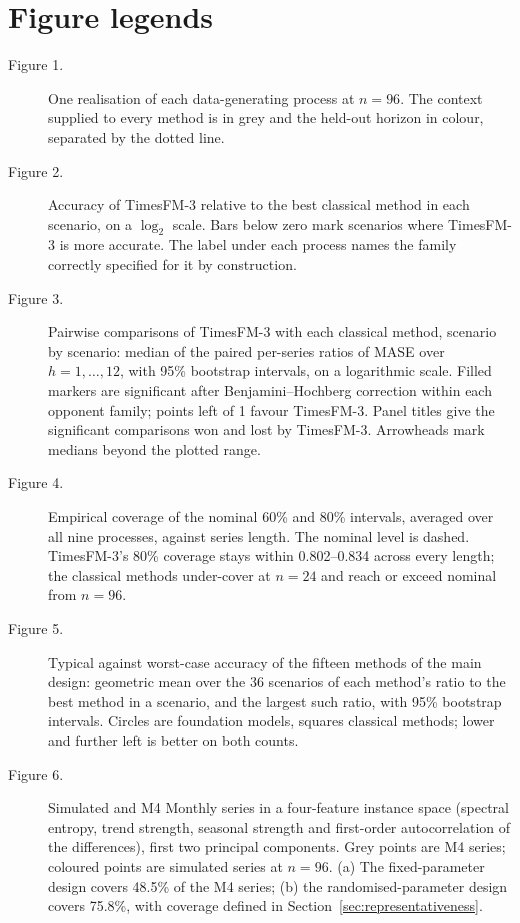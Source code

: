 \documentclass[ASNA]{USG}
\providecommand{\sectionref}[1]{Section~\ref{#1}}
\begin{document}
\section*{Figure legends}

\begin{description}
\item[Figure 1.] One realisation of each data-generating process at $n = 96$. The context supplied to every method is in grey and the held-out horizon in colour, separated by the dotted line.
\item[Figure 2.] Accuracy of TimesFM-3 relative to the best classical method in each scenario, on a $\log_2$ scale. Bars below zero mark scenarios where TimesFM-3 is more accurate. The label under each process names the family correctly specified for it by construction.
\item[Figure 3.] Pairwise comparisons of TimesFM-3 with each classical method, scenario by scenario: median of the paired per-series ratios of MASE over $h = 1, \dots, 12$, with 95\% bootstrap intervals, on a logarithmic scale. Filled markers are significant after Benjamini--Hochberg correction within each opponent family; points left of 1 favour TimesFM-3. Panel titles give the significant comparisons won and lost by TimesFM-3. Arrowheads mark medians beyond the plotted range.
\item[Figure 4.] Empirical coverage of the nominal 60\% and 80\% intervals, averaged over all nine processes, against series length. The nominal level is dashed. TimesFM-3's 80\% coverage stays within 0.802--0.834 across every length; the classical methods under-cover at $n = 24$ and reach or exceed nominal from $n = 96$.
\item[Figure 5.] Typical against worst-case accuracy of the fifteen methods of the main design: geometric mean over the 36 scenarios of each method's ratio to the best method in a scenario, and the largest such ratio, with 95\% bootstrap intervals. Circles are foundation models, squares classical methods; lower and further left is better on both counts.
\item[Figure 6.] Simulated and M4 Monthly series in a four-feature instance space (spectral entropy, trend strength, seasonal strength and first-order autocorrelation of the differences), first two principal components. Grey points are M4 series; coloured points are simulated series at $n = 96$. (a) The fixed-parameter design covers 48.5\% of the M4 series; (b) the randomised-parameter design covers 75.8\%, with coverage defined in \sectionref{sec:representativeness}.
\end{description}
\end{document}
